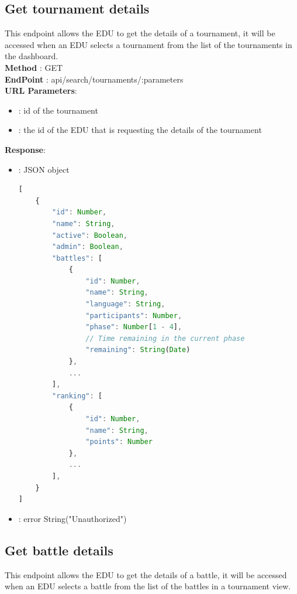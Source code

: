 \subsection*{Get tournament details}
This endpoint allows the EDU to get the details of a tournament, it will be accessed when an EDU selects a tournament from the list of the tournaments in the dashboard.\\
\textbf{Method} : GET \\
\textbf{EndPoint} : api/search/tournaments/:parameters \\
\textbf{URL Parameters}:
\begin{itemize}
    \item {} : id of the tournament
    \item {}: the id of the EDU that is requesting the details of the tournament
\end{itemize}
\textbf{Response}:
\begin{itemize}
    \item {} : JSON object
          \begin{lstlisting}[language=JavaScript, label={lst:jscode}, basicstyle=\ttfamily]
[
    {
        "id": Number,
        "name": String,
        "active": Boolean,
        "admin": Boolean,
        "battles": [
            {
                "id": Number,
                "name": String,
                "language": String,
                "participants": Number,
                "phase": Number[1 - 4],
                // Time remaining in the current phase
                "remaining": String(Date)
            },
            ...
        ],
        "ranking": [
            {
                "id": Number,
                "name": String,
                "points": Number
            },
            ...
        ],
    }
]
            \end{lstlisting}
    \item {} : error String("Unauthorized")
\end{itemize}

\subsection*{Get battle details}
This endpoint allows the EDU to get the details of a battle, it will be accessed when an EDU selects a battle from the list of the battles in a tournament view.\\

